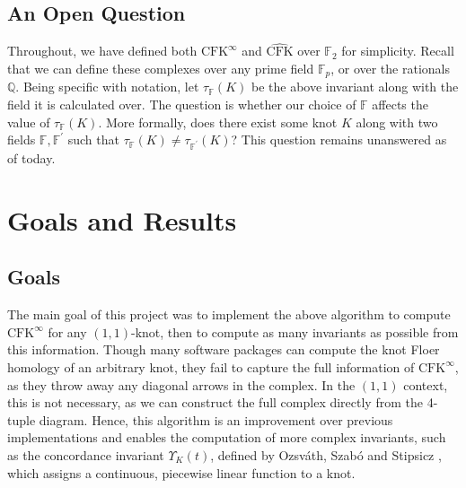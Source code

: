 \documentclass[reqno, 12pt]{amsart}
\theoremstyle{remark}
\begin{document}
\subsection{An Open Question}
Throughout, we have defined both $\text{CFK}^{\infty}$ and $\widehat{\text{CFK}}$ over $\mathbb{F}_2$ for simplicity. Recall that we can define these complexes over any prime field $\mathbb{F}_p$, or over the rationals $\mathbb{Q}$. Being specific with notation, let $\tau_{\mathbb{F}}(K)$ be the above invariant along with the field it is calculated over. The question is whether our choice of $\mathbb{F}$ affects the value of $\tau_{\mathbb{F}}(K)$. More formally, does there exist some knot $K$ along with two fields $\mathbb{F}, \mathbb{F}^{'}$ such that $\tau_{\mathbb{F}}(K) \ne \tau_{\mathbb{F}^{'}}(K)$? This question remains unanswered as of today.

\section{Goals and Results}

\subsection{Goals}
The main goal of this project was to implement the above algorithm to compute $\text{CFK}^{\infty}$ for any $(1,1)$-knot, then to compute as many invariants as possible from this information. Though many software packages can compute the knot Floer homology of an arbitrary knot, they fail to capture the full information of $\text{CFK}^{\infty}$, as they throw away any diagonal arrows in the complex. In the $(1,1)$ context, this is not necessary, as we can construct the full complex directly from the 4-tuple diagram. Hence, this algorithm is an improvement over previous implementations and enables the computation of more complex invariants, such as the concordance invariant $\Upsilon_K(t)$, defined by Ozsv\'ath, Szab\'o and Stipsicz \cite[Section~1.1]{Ozsv_th_2017} , which assigns a continuous, piecewise linear function to a knot.
\end{document}
